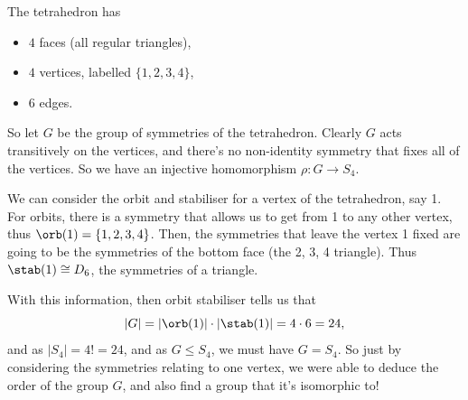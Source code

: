 \begin{center}
\end{center}


The tetrahedron has
\begin{itemize}
	\item $4$ faces (all regular triangles),
	\item $4$ vertices, labelled $\{1, 2, 3, 4\}$,
	\item $6$ edges.
\end{itemize}

So let $G$ be the group of symmetries of the tetrahedron. Clearly $G$ acts transitively on the vertices, and there's no non-identity symmetry that fixes all of the vertices. So we have an injective homomorphism $\rho : G \rightarrow S_4$.

We can consider the orbit and stabiliser for a vertex of the tetrahedron, say 1. For orbits, there is a symmetry that allows us to get from 1 to any other vertex, thus $\orb(1) = \{1, 2, 3, 4\}$. Then, the symmetries that leave the vertex 1 fixed are going to be the symmetries of the bottom face (the 2, 3, 4 triangle). Thus $\stab(1) \cong D_6$, the symmetries of a triangle. 

With this information, then orbit stabiliser tells us that
$$
|G| = |\orb(1)| \cdot |\stab(1)| = 4 \cdot 6 = 24,
$$
and as $|S_4| = 4! = 24$, and as $G \leq S_4$, we must have $G = S_4$. So just by considering the symmetries relating to one vertex, we were able to deduce the order of the group $G$, and also find a group that it's isomorphic to!

